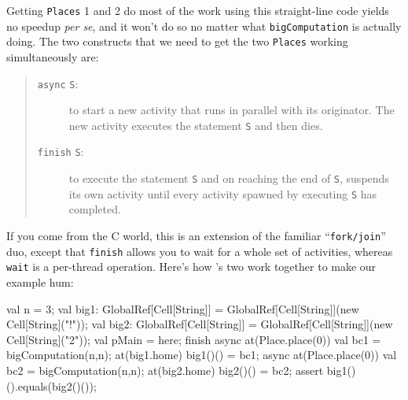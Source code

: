 Getting  {\tt Places} 1 and 2 do most of the work using this straight-line
code yields no
speedup {\em per se}, and it won't do so no
matter what {\tt bigComputation} is actually doing.  The two
constructs that we need to get the two {\tt Places} working simultaneously are:
\begin{quote}
\begin{description}
\item[ {\tt async} {\tt S}:] to start a new
activity that runs in parallel with its originator.  The new activity executes the
statement {\tt S} and then dies.
\item[{\tt finish} {\tt S}:] to execute the statement {\tt S} and on reaching the
end of {\tt S}, suspends its own activity until every activity spawned by
executing {\tt S} has completed.  
\end{description}
\end{quote}
If you come from the C world, this is an extension of the familiar ``{\tt fork/join}''
duo, except that {\tt finish} allows you to wait for a whole set of activities,
whereas {\tt wait} is a per-thread operation.
Here's how \Xten's two work together to make our example hum:
\begin{xtennum}[]
      val n = 3;
      val big1: GlobalRef[Cell[String]] = GlobalRef[Cell[String]](new Cell[String]("!"));
      val big2: GlobalRef[Cell[String]] = GlobalRef[Cell[String]](new Cell[String]("2"));
      val pMain = here;   
      finish { 
         async at(Place.place(0)) { 
            val bc1 = bigComputation(n,n);
            at(big1.home) big1()() = bc1; 
         }
         async at(Place.place(0)) { 
            val bc2 = bigComputation(n,n);
            at(big2.home) big2()() = bc2; 
         }
      } 
      assert big1()().equals(big2()()); 
\end{xtennum}

